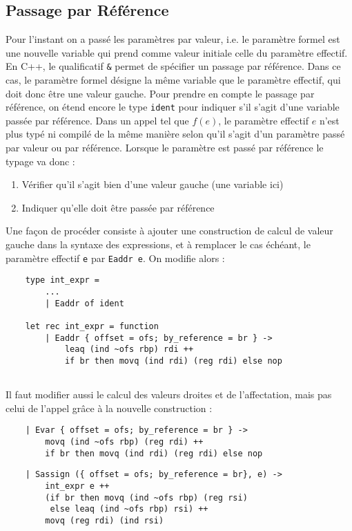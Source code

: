 \documentclass{cours}
\begin{document}
\subsection{Passage par Référence}
Pour l'instant on a passé les paramètres par valeur, i.e. le paramètre formel est une nouvelle variable qui prend comme valeur initiale celle du paramètre effectif. En C++, le qualificatif \texttt{\&} permet de spécifier un passage par référence. Dans ce cas, le paramètre formel désigne la même variable que le paramètre effectif, qui doit donc être une valeur gauche. 
Pour prendre en compte le passage par référence, on étend encore le type \texttt{ident} pour indiquer s'il s'agit d'une variable passée par référence. Dans un appel tel que $f(e)$, le paramètre effectif $e$ n'est plus typé ni compilé de la même manière selon qu'il s'agit d'un paramètre passé par valeur ou par référence. Lorsque le paramètre est passé par référence le typage va donc :
\begin{enumerate}
    \item Vérifier qu'il s'agit bien d'une valeur gauche (une variable ici)
    \item Indiquer qu'elle doit être passée par référence
\end{enumerate}

Une façon de procéder consiste à ajouter une construction de calcul de valeur gauche dans la syntaxe des expressions, et à remplacer le cas échéant, le paramètre effectif \texttt{e} par \texttt{Eaddr e}.
On modifie alors : 
\begin{verbatim}
    type int_expr =
        ...
        | Eaddr of ident

    let rec int_expr = function
        | Eaddr { offset = ofs; by_reference = br } ->
            leaq (ind ~ofs rbp) rdi ++
            if br then movq (ind rdi) (reg rdi) else nop
    
\end{verbatim}

Il faut modifier aussi le calcul des valeurs droites et de l'affectation, mais pas celui de l'appel grâce à la nouvelle construction : 
\begin{verbatim}
    | Evar { offset = ofs; by_reference = br } ->
        movq (ind ~ofs rbp) (reg rdi) ++
        if br then movq (ind rdi) (reg rdi) else nop
\end{verbatim}

\begin{verbatim}
    | Sassign ({ offset = ofs; by_reference = br}, e) ->
        int_expr e ++
        (if br then movq (ind ~ofs rbp) (reg rsi)
         else leaq (ind ~ofs rbp) rsi) ++
        movq (reg rdi) (ind rsi)
\end{verbatim}
\end{document}
